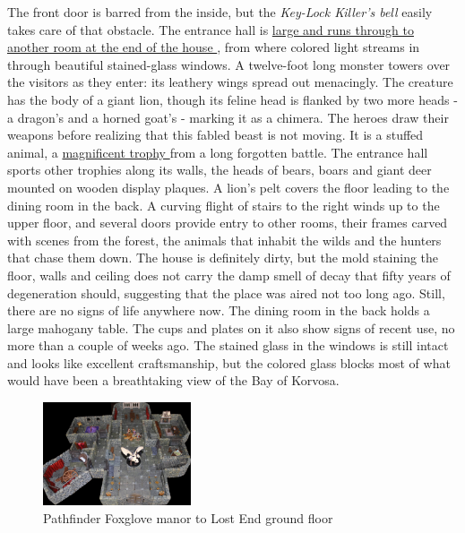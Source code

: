 The front door is barred from the inside, but the {\itshape Key-Lock Killer's bell} easily takes care of that obstacle. The entrance hall is \hyperref[fig:Pathfinder-Foxglove-manor-to-Lost-End-ground-floor-513919727]{ large and runs through to another room at the end of the house } , from where colored light streams in through beautiful stained-glass windows. A twelve-foot long monster towers over the visitors as they enter: its leathery wings spread out menacingly. The creature has the body of a giant lion, though its feline head is flanked by two more heads - a dragon's and a horned goat's - marking it as a chimera. The heroes draw their weapons before realizing that this fabled beast is not moving. It is a stuffed animal, a \hyperref[fig:Pathfinder-Foxglove-manor-to-Lost-End-chimera-513923128]{ magnificent trophy } from a long forgotten battle. The entrance hall sports other trophies along its walls, the heads of bears, boars and giant deer mounted on wooden display plaques. A lion's pelt covers the floor leading to the dining room in the back. A curving flight of stairs to the right winds up to the upper floor, and several doors provide entry to other rooms, their frames carved with scenes from the forest, the animals that inhabit the wilds and the hunters that chase them down. The house is definitely dirty, but the mold staining the floor, walls and ceiling does not carry the damp smell of decay that fifty years of degeneration should, suggesting that the place was aired not too long ago. Still, there are no signs of life anywhere now. The dining room in the back holds a large mahogany table. The cups and plates on it also show signs of recent use, no more than a couple of weeks ago. The stained glass in the windows is still intact and looks like excellent craftsmanship, but the colored glass blocks most of what would have been a breathtaking view of the Bay of Korvosa. \\

\begin{figure}[h]
	\centering
	\includegraphics[width=0.39\textwidth]{images/Pathfinder-Foxglove-manor-to-Lost-End-ground-floor-513919727.jpg}
	\caption{Pathfinder Foxglove manor to Lost End ground floor}
	\label{fig:Pathfinder-Foxglove-manor-to-Lost-End-ground-floor-513919727}
\end{figure}

